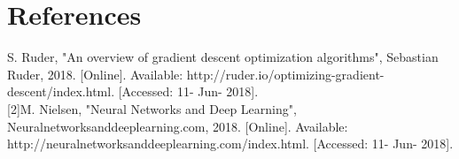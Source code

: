 \documentclass[a4paper, 12pt]{amsart}
\begin{document}
\section{References}

\begin{flushleft}
[1]S. Ruder, "An overview of gradient descent optimization algorithms", Sebastian Ruder, 2018. [Online]. Available: http://ruder.io/optimizing-gradient-descent/index.html. [Accessed: 11- Jun- 2018].\\

[2]M. Nielsen, "Neural Networks and Deep Learning", Neuralnetworksanddeeplearning.com, 2018. [Online]. Available: http://neuralnetworksanddeeplearning.com/index.html. [Accessed: 11- Jun- 2018].\\
\end{flushleft}
\end{document}
